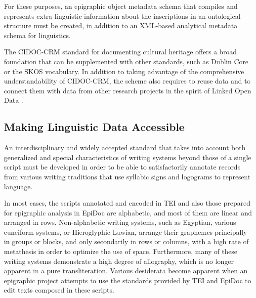 \documentclass[amsthm,ebook]{saparticle}
\begin{document}
For these purposes, an epigraphic object metadata schema that compiles and represents extra-linguistic information about
the inscriptions in an ontological structure must be created, in addition to an XML-based analytical metadata schema
for linguistics. 

The CIDOC-CRM standard for documenting cultural heritage offers a broad foundation that can be supplemented with other
standards, such as Dublin Core or the SKOS vocabulary. In addition to taking advantage of the comprehensive
understandability of CIDOC-CRM, the scheme also requires to reuse data and to connect them with data from other
research projects in the spirit of Linked Open Data \citep{Diederichs2015, Prager2015}. %

\subsection[Making Linguistic Data Accessible]{Making Linguistic Data Accessible}
\noindent An interdisciplinary and widely accepted standard that takes into account both generalized and special characteristics
of writing systems beyond those of a single script must be developed in order to be able to satisfactorily annotate
records from various writing traditions that use syllabic signs and logograms to represent language.

In most cases, the scripts annotated and encoded in TEI and also those prepared for epigraphic analysis in EpiDoc are
alphabetic, and most of them are linear and arranged in rows. Non-alphabetic writing systems, such as Egyptian, various
cuneiform systems, or Hieroglyphic Luwian, arrange their graphemes principally in groups or blocks, and only
secondarily in rows or columns, with a high rate of metathesis \citep{Lacau1903} in order to optimize the use of space.
Furthermore, many of these writing systems demonstrate a high degree of allography, which is no longer apparent in a
pure transliteration. Various desiderata become apparent when an epigraphic project attempts to use the standards
provided by TEI and EpiDoc to edit texts composed in these scripts. 
\end{document}
